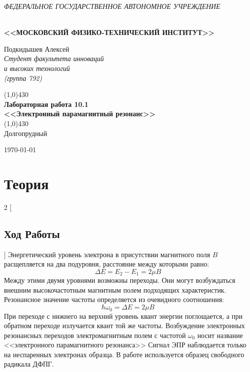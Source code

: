 \documentclass[a4paper,12pt]{article}
\theoremstyle{plain} %
\theoremstyle{definition} %
\theoremstyle{remark} %
\renewcommand{\headrulewidth}{0mm}  %
\begin{document}

\begin{center}
	\textit{\MakeTextUppercase{федеральное государственное автономное учреждение}}
		
	\vspace{0.5ex}
	
	\textbf{ \\ \MakeTextUppercase{<<Московский Физико-технический институт>>}}
\end{center}
\vspace{13ex}
\begin{flushright}
	\noindent
	{Подкидышев Алексей}
	\\
	\textit{Студент факультета инноваций\\ и высоких технологий\\(группа 792)}
\end{flushright}
\begin{center}
	\vspace{23ex}
	\line(1,0){430}\\[4ex]
	{\LARGE\textbf{Лабораторная работа 10.1}}
	\vspace{2ex}\\
	\textbf{\large{<<Электронный парамагнитный резонанс>>}}\\[3ex]
	\line(1,0){430}\\[5ex]
	\vfill
	Долгопрудный 
	
	{\today}
\end{center}
\newpage
\renewcommand{\headrulewidth}{1pt}
	\section{Теория}
\begin{multicols}{2}
[
\subsection*{Ход Работы}
]
	Энергетический уровень электрона в присутствии магнитного поля $B$ расщепляется на два подуровня, расстояние между которыми равно:
		\begin{equation}
		    \Delta E = E_2 - E_1 = 2\mu B
		\end{equation}
		Между этими двумя уровнями возможны переходы. Они могут возбуждаться внешним высокочастотным магнитным полем подходящих характеристик.
		Резонансное значение частоты определяется из очевидного соотношения:
		\begin{equation}
		    \hbar\omega_0 = \Delta E =2\mu B
		\end{equation}
	    При переходе с нижнего на верхний уровень квант энергии поглощается, а при обратном переходе излучается квант той же частоты. Возбуждение электронных резонансных переходов электромагнитным полем с частотой $\omega_0$ носит название <<электронного парамагнитного резонанса>>
	    Сигнал ЭПР наблюдается только на неспаренных электронах образца. В работе используется образец свободного радикала ДФПГ.
\end{multicols}
\end{document}

